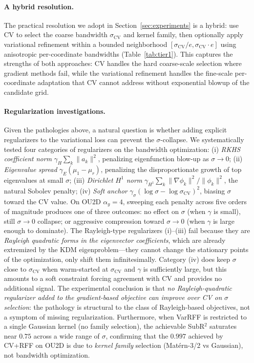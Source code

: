 \documentclass[11pt]{article}
\theoremstyle{remark}
\begin{document}
\paragraph{A hybrid resolution.}
The practical resolution we adopt in Section~\ref{sec:experiments} is a hybrid: use CV to select the coarse bandwidth $\sigma_{\mathrm{CV}}$ and kernel family, then optionally apply variational refinement within a bounded neighborhood $[\sigma_{\mathrm{CV}}/e,\sigma_{\mathrm{CV}}\cdot e]$ using anisotropic per-coordinate bandwidths (Table~\ref{tab:tier1}).
This captures the strengths of both approaches: CV handles the hard coarse-scale selection where gradient methods fail, while the variational refinement handles the fine-scale per-coordinate adaptation that CV cannot address without exponential blowup of the candidate grid.

\paragraph{Regularization investigations.}
Given the pathologies above, a natural question is whether adding explicit regularizers to the variational loss can prevent the $\sigma$-collapse.
We systematically tested four categories of regularizers on the bandwidth optimization:
(i) \emph{RKHS coefficient norm} $\gamma_H\sum_k\|a_k\|^2$, penalizing eigenfunction blow-up as $\sigma\to 0$;
(ii) \emph{Eigenvalue spread} $\gamma_E(\mu_1-\mu_r)$, penalizing the disproportionate growth of top eigenvalues at small $\sigma$;
(iii) \emph{Dirichlet $H^1$ norm} $\gamma_{H^1}\sum_k\|\nabla\phi_k\|^2/\|\phi_k\|^2$, the natural Sobolev penalty;
(iv) \emph{Soft anchor} $\gamma_\sigma(\log\sigma-\log\sigma_{\mathrm{CV}})^2$, biasing $\sigma$ toward the CV value.
On OU2D $\alpha_y=4$, sweeping each penalty across five orders of magnitude produces one of three outcomes: no effect on $\sigma$ (when $\gamma$ is small), still $\sigma\to 0$ collapse; or aggressive compression toward $\sigma\to 0$ (when $\gamma$ is large enough to dominate).
The Rayleigh-type regularizers (i)--(iii) fail because they are \emph{Rayleigh quadratic forms in the eigenvector coefficients}, which are already extremized by the KDM eigenproblem---they cannot change the stationary points of the optimization, only shift them infinitesimally.
Category (iv) does keep $\sigma$ close to $\sigma_{\mathrm{CV}}$ when warm-started at $\sigma_{\mathrm{CV}}$ and $\gamma$ is sufficiently large, but this amounts to a soft constraint forcing agreement with CV and provides no additional signal.
The experimental conclusion is that \emph{no Rayleigh-quadratic regularizer added to the gradient-based objective can improve over CV on $\sigma$ selection}: the pathology is structural to the class of Rayleigh-based objectives, not a symptom of missing regularization.
Furthermore, when VarRFF is restricted to a single Gaussian kernel (no family selection), the achievable SubR$^2$ saturates near $0.75$ across a wide range of $\sigma$, confirming that the $0.997$ achieved by CV+RFF on OU2D is due to \emph{kernel family} selection (Mat\'ern-3/2 vs Gaussian), not bandwidth optimization.
\end{document}
